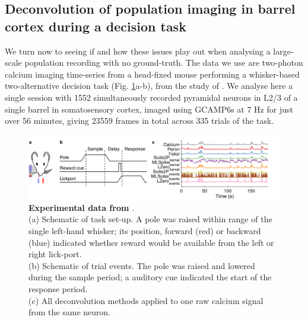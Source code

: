 \documentclass[a4paper,11pt]{article}
\begin{document}
\subsection{Deconvolution of population imaging in barrel cortex during a decision task}
We turn now to seeing if and how these issues play out when analysing a large-scale population recording with no ground-truth. The data we use are two-photon calcium imaging time-series from a head-fixed mouse performing a whisker-based two-alternative decision task (Fig. \ref{fig:peron_setup}a-b), from the study of \citet{Peron2015-kd}. We analyse here a single session with 1552 simultaneously recorded pyramidal neurons in L2/3 of a single barrel in somatosensory cortex, imaged using GCAMP6s at 7 Hz for just over 56 minutes, giving 23559 frames in total across 335 trials of the task. 

\begin{figure}[h!]
\includegraphics[width=\textwidth]{composite_figs/fig3_schematic.png}
    \caption{\label{fig:peron_setup} \textbf{Experimental data from \citet{Peron2015-kd}}. \\
		(a) Schematic of task set-up. A pole was raised within range of the single left-hand whisker; its position, forward (red) or backward (blue) indicated whether reward would be available from the left or right lick-port. \\
		(b) Schematic of trial events. The pole was raised and lowered during the sample period; a auditory cue indicated the start of the response period. \\
		(c) All deconvolution methods applied to one raw calcium signal from the same neuron.}
\end{figure}
\end{document}
